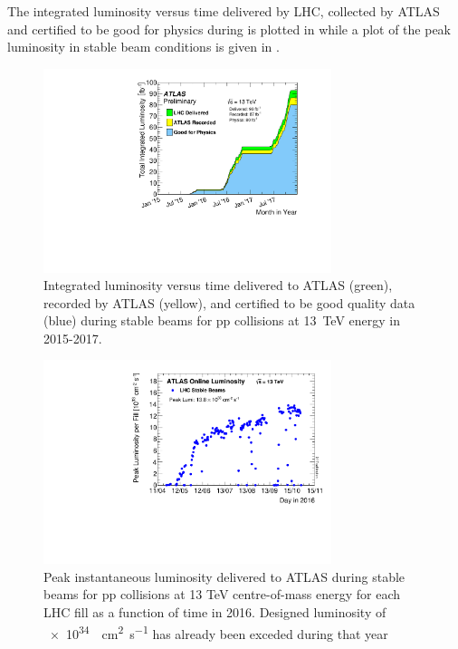 The integrated luminosity versus time delivered by LHC, collected by ATLAS and certified to be good for physics during \RunTwo is plotted in \Fig{\ref{fig:lumi}} while a plot of the peak luminosity in stable beam conditions is given in \Fig{\ref{fig:peakLumiByFill}}.
\begin{figure}[tp]
	\centering
	\includegraphics[width=0.75\textwidth]{LHC_ATLAS/intlumivstimeRun2DQ.pdf}
	\caption{Integrated luminosity versus time delivered to ATLAS (green), recorded by ATLAS (yellow), and certified to be good quality data (blue) during stable beams for pp collisions at \SI{13}{TeV} \cm energy in 2015-2017.}
	\label{fig:lumi}
\end{figure}
\begin{figure}[tp]
	\centering
	\includegraphics[width=0.75\textwidth]{LHC_ATLAS/peakLumiByFill}
	\caption{Peak instantaneous luminosity delivered to ATLAS during stable beams for pp collisions at 13 TeV centre-of-mass energy for each LHC fill as a function of time in 2016. Designed luminosity of \SI{e34}{\per\cm\squared\per\s} has already been exceded during that year}
	\label{fig:peakLumiByFill}
\end{figure}

